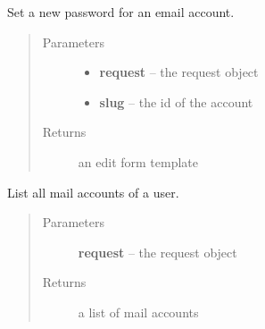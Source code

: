 \documentclass[letterpaper,10pt,english]{sphinxmanual}
\begin{document}

\begin{fulllineitems}
\label{api/mail:limeade.mail.views.account_edit}
Set a new password for an email account.
\begin{quote}\begin{description}
\item[{Parameters}] \leavevmode\begin{itemize}
\item {} 
\textbf{request} -- the request object

\item {} 
\textbf{slug} -- the id of the account

\end{itemize}

\item[{Returns}] \leavevmode
an edit form template

\end{description}\end{quote}

\end{fulllineitems}


\begin{fulllineitems}
\label{api/mail:limeade.mail.views.account_list}
List all mail accounts of a user.
\begin{quote}\begin{description}
\item[{Parameters}] \leavevmode
\textbf{request} -- the request object

\item[{Returns}] \leavevmode
a list of mail accounts

\end{description}\end{quote}

\end{fulllineitems}

\end{document}
